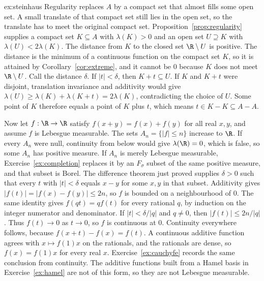 \begin{solution}{ex:steinhaus}
\idea Regularity replaces $A$ by a compact set that almost fills some open set.
A small translate of that compact set still lies in the open set, so the translate has to meet the original compact set.
\writeup Proposition~\ref{prop:regularity} supplies a compact set $K\subseteq A$ with $\lambda(K)>0$ and an open set $U\supseteq K$ with $\lambda(U)<2\lambda(K)$.
The distance from $K$ to the closed set $\R\setminus U$ is positive.
The distance is the minimum of a continuous function on the compact set $K$, so it is attained by Corollary~\ref{cor:extreme}, and it cannot be $0$ because $K$ does not meet $\R\setminus U$.
Call the distance $\delta$.
If $|t|<\delta$, then $K+t\subseteq U$.
If $K$ and $K+t$ were disjoint, translation invariance and additivity would give $\lambda(U)\ge\lambda(K)+\lambda(K+t)=2\lambda(K)$, contradicting the choice of $U$.
Some point of $K$ therefore equals a point of $K$ plus $t$, which means $t\in K-K\subseteq A-A$.

Now let $f:\R\to\R$ satisfy $f(x+y)=f(x)+f(y)$ for all real $x,y$, and assume $f$ is Lebesgue measurable.
The sets $A_n=\{|f|\le n\}$ increase to $\R$.
If every $A_n$ were null, continuity from below would give $\lambda(\R)=0$, which is false, so some $A_n$ has positive measure.
If $A_n$ is merely Lebesgue measurable, Exercise~\ref{ex:completion} replaces it by an $F_\sigma$ subset of the same positive measure, and that subset is Borel.
The difference theorem just proved supplies $\delta>0$ such that every $t$ with $|t|<\delta$ equals $x-y$ for some $x,y$ in that subset.
Additivity gives $|f(t)|=|f(x)-f(y)|\le 2n$, so $f$ is bounded on a neighbourhood of $0$.
The same identity gives $f(qt)=qf(t)$ for every rational $q$, by induction on the integer numerator and denominator.
If $|t|<\delta/|q|$ and $q\ne0$, then $|f(t)|\le 2n/|q|$.
Thus $f(t)\to0$ as $t\to0$, so $f$ is continuous at $0$.
Continuity everywhere follows, because $f(x+t)-f(x)=f(t)$.
A continuous additive function agrees with $x\mapsto f(1)x$ on the rationals, and the rationals are dense, so $f(x)=f(1)x$ for every real $x$.
Exercise~\ref{ex:cauchyfe} records the same conclusion from continuity.
The additive functions built from a Hamel basis in Exercise~\ref{ex:hamel} are not of this form, so they are not Lebesgue measurable.
\end{solution}

